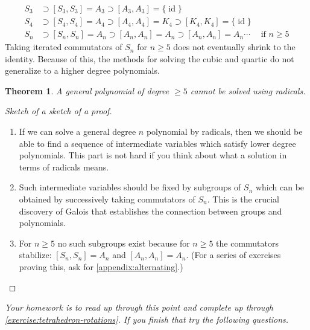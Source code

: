 \documentclass[reqno, 12pt, letter]{article}
\theoremstyle{plain}
\newtheorem{theorem}{Theorem}[section]
\theoremstyle{definition}
\theoremstyle{remark}
\numberwithin{equation}{section}
\DeclareMathOperator\id{id}
\begin{document}
\begin{align*}
	S_3 & \supset [S_3, S_3] = A_3 \supset [A_3, A_3] = \{ \id \}                          &                      \\
	S_4 & \supset [S_4, S_4] = A_4 \supset [A_4, A_4] = K_4 \supset [K_4, K_4] = \{ \id \} &                      \\
	S_n & \supset [S_n, S_n] = A_n \supset [A_n, A_n] = A_n \supset [A_n, A_n] = A_n \cdots                                & \text{ if } n \geq 5
\end{align*}
Taking iterated commutators of $S_n$ for $n \geq 5$ does not eventually shrink to the identity. Because of this, the methods for solving the cubic and quartic do not generalize to a higher degree polynomials.
\begin{theorem}
	A general polynomial of degree $ \ge 5$ cannot be solved using radicals.
\end{theorem}
\begin{proof}[Sketch of a sketch of a proof] $ $
	\begin{enumerate}
		\item If we can solve a general degree $ n$ polynomial by radicals, then we should be able to find a sequence of intermediate variables which satisfy lower degree polynomials. {This part is not hard if you think about what a solution in terms of radicals means.}
		\item Such intermediate variables should be fixed by subgroups of $ S_n$ which can be obtained by successively taking commutators of $ S_n$. {This is the crucial discovery of Galois that establishes the connection between groups and polynomials.}
		\item For $ n \ge 5$ no such subgroups exist because for $ n \ge 5$ the commutators stabilize: $[S_n, S_n] = A_n$ and $ [A_n, A_n] = A_n$.
		(For a series of exercises proving this, ask for \autoref{appendix:alternating}.)
	\end{enumerate}
\end{proof}


{\it Your homework is to read up through this point and complete up through \autoref{exercise:tetrahedron-rotations}. If you finish that try the following questions.}

\iffalse
\end{document}
